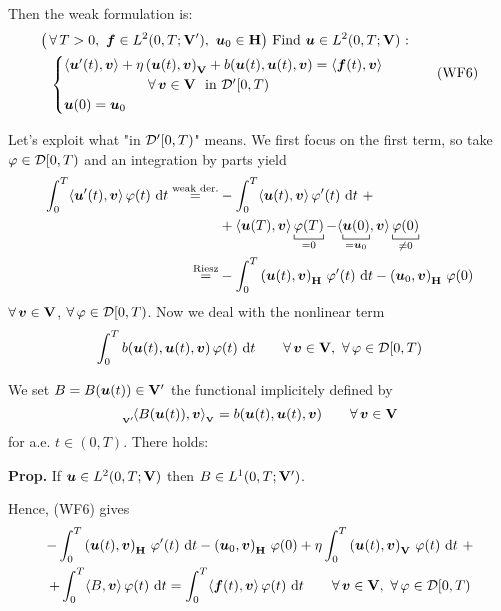 \smallskip

Then the weak formulation is:
\begin{equation*}
\begin{gathered}
\big(\,\forall\,T>0,\ \bm f\in L^2(0,T;\mathbf{V}'),\ \bm u_0\in\mathbf{H}\big)\text{ Find }\bm u\in L^2(0,T;\mathbf{V}) \text{ :} \\
\begin{cases}
\langle \bm u'(t),\bm v \rangle +\eta \left(\bm u(t),\bm v\right)_{\mathbf{V}}+b(\bm u(t),\bm u(t),\bm v)= \langle \bm f(t),\bm v \rangle \\
\qquad\qquad\qquad \forall\, \bm v\in\mathbf{V}\ \text{ in }\mathcal{D}'[0,T) \\
\bm u(0)=\bm u_0
\end{cases}   
\end{gathered}
\tag{WF6}
\end{equation*}

Let's exploit what "in $\mathcal{D}'[0,T)$" means. We first focus on the first term, so take $\varphi \in \mathcal{D}[0,T)$ and an integration by parts yield
\begin{align*}
\int_0^T \langle\bm u'(t),\bm v\rangle\,\varphi(t)\dt\overset{\text{weak der.}}{=}&-\int_0^T \langle\bm u(t),\bm v\rangle\,\varphi'(t)\dt\ +\\
&+ \langle\bm u(T),\bm v\rangle\underbracket[0.5pt]{\varphi(T)}_{=0}-\langle\underbracket[0.5pt]{\bm u(0)}_{=\bm u_0},\bm v\rangle\underbracket[0.5pt]{\varphi(0)}_{\neq 0} \\
\overset{\text{Riesz}}{=}& - \int_0^T \left( \bm u(t),\bm v \right)_\Hv\, \varphi'(t)\dt - \left( \bm u_0,\bm v \right)_\Hv\,\varphi(0)
\end{align*}
$\forall\, \bm v \in \mathbf{V}$, $\forall\,\varphi\in\mathcal{D}[0,T)$. Now we deal with the nonlinear term
\begin{equation*}
\int_0^T b(\bm u(t),\bm u(t),\bm v)\,\varphi(t)\dt\qquad \forall\, \bm v \in \Vv,\ \forall\,\varphi\in\Dc[0,T)
\end{equation*}

We set $B=B(\bm u(t))\in\mathbf{V}'$ the functional implicitely defined by 
\begin{equation*}
{}_{_{\mathbf{V}'}}\!\langle B(\bm u(t)),\bm v \rangle{}_{_{\mathbf{V}}}=b(\bm u(t),\bm u(t),\bm v)\qquad \forall\, \bm v\in \mathbf{V}
\end{equation*}
for a.e. $t\in(0,T)$. There holds:
\smallskip

\textbf{Prop.} If $\bm u\in L^2(0,T;\mathbf{V})$ then $B\in L^1(0,T;\mathbf{V}')$.

\smallskip

Hence, (WF6) gives
\begin{gather*}
- \int_0^T \left( \bm u(t),\bm v \right)_\Hv\, \varphi'(t)\dt - \left( \bm u_0,\bm v \right)_\Hv\,\varphi(0)+\eta \int_0^T \left( \bm u(t),\bm v \right)_\Vv\,\varphi(t)\dt\ + \\
+\int_0^T \langle B,\bm v \rangle\,\varphi(t)\dt=\int_0^T \langle \bm f(t),\bm v \rangle\,\varphi(t)\dt\qquad \forall\, \bm v \in \Vv,\ \forall\,\varphi\in\Dc[0,T)
\end{gather*}

